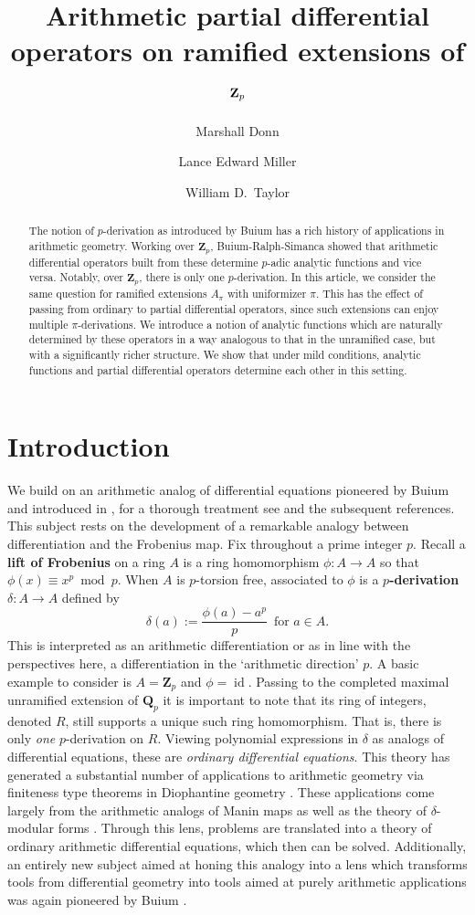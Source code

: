 \documentclass[10pt]{amsart}
\title{Arithmetic partial differential operators on ramified extensions of $\ZZ_p$}
\author{Marshall Donn}
\author{Lance Edward Miller}
\author{William D.\ Taylor}
\theoremstyle{Theorem}
\theoremstyle{definition}
\newcommand{\ZZ}{\mathbf Z}
\newcommand{\QQ}{\mathbf Q}
\newcommand{\id}{\operatorname{id}}
\renewcommand{\d}{\delta}
\begin{document}
\begin{abstract}
The notion of $p$-derivation as introduced by Buium has a rich history of applications in arithmetic geometry. Working over $\ZZ_p$, Buium-Ralph-Simanca showed that arithmetic differential operators built from these determine $p$-adic analytic functions and vice versa. Notably, over $\ZZ_p$, there is only one $p$-derivation. In this article, we consider the same question for ramified extensions $A_\pi$ with uniformizer $\pi$. This has the effect of passing from ordinary to partial differential operators, since such extensions can enjoy multiple $\pi$-derivations. We introduce a notion of analytic functions which are naturally determined by these operators in a way analogous to that in the unramified case, but with a significantly richer structure.  We show that under mild conditions, analytic functions and partial differential operators determine each other in this setting.

\end{abstract}
\maketitle

\section{Introduction}

We build on an arithmetic analog of differential equations pioneered by Buium and introduced in \cite{Bui96}, for a thorough treatment see \cite{Bui05} and the subsequent references. This subject rests on the development of a remarkable analogy between differentiation and the Frobenius map. Fix throughout a prime integer $p$. Recall a {\bf lift of Frobenius} on a ring $A$ is a ring homomorphism $\phi \colon A \to A$ so that $\phi(x) \equiv x^p \bmod p$. When $A$ is $p$-torsion free, associated to $\phi$ is a {\bf $p$-derivation} $\delta \colon A \to A$ defined by 
$$\delta (a) := \frac{\phi(a) - a^p}{p}\, \textrm{ for } a \in A.$$ 
This is interpreted as an arithmetic differentiation or as in line with the perspectives here, a differentiation in the `arithmetic direction' $p$. A basic example to consider is $A = \ZZ_p$ and $\phi = \id$. Passing to the completed maximal unramified extension of $\QQ_p$ it is important to note that its ring of integers, denoted $R$, still supports a unique such ring homomorphism. That is, there is only {\it one} $p$-derivation on $R$. Viewing polynomial expressions in $\d$ as analogs of differential equations, these are {\it ordinary differential equations}. This theory has generated a substantial number of applications to arithmetic geometry via finiteness type theorems in Diophantine geometry \cite{Bui96,BP09}. These applications come largely from the arithmetic analogs of Manin maps \cite{Bui95} as well as the theory of $\delta$-modular forms \cite{Bui00,Bui08}. Through this lens, problems are translated into a theory of ordinary arithmetic differential equations, which then can be solved. Additionally, an entirely new subject aimed at honing this analogy into a lens which transforms tools from differential geometry into tools aimed at purely arithmetic applications was again pioneered by Buium \cite{Bui17,Bui19}. 
\end{document}
